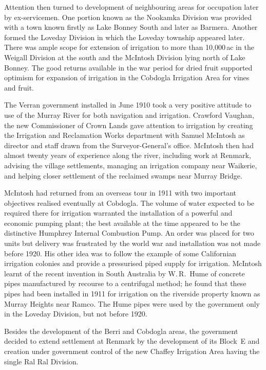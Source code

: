 Attention then turned to development of neighbouring areas for
occupation later by ex-servicemen.  One portion known as the Nookamka
Division was provided with a town known firstly as Lake Bonney South
and later as Barmera.  Another formed the Loveday Division in which
the Loveday township appeared later.  There was ample scope for
extension of irrigation to more than 10,000\,ac in the Weigall
Division at the south and the McIntosh Division lying north of Lake
Bonney.  The good returns available in the war period for dried fruit
supported optimism for expansion of irrigation in the Cobdogla
Irrigation Area for vines and fruit.

The Verran government installed in June 1910 took a very positive
attitude to use of the Murray River for both navigation and
irrigation.  Crawford Vaughan, the new Commissioner of Crown Lands
gave attention to irrigation by creating the Irrigation and
Reclamation Works department with Samuel McIntosh as director and
staff drawn from the Surveyor-General's office.  McIntosh then had
almost twenty years of experience along the river, including work at
Renmark, advising the village settlements, managing an irrigation
company near Waikerie, and helping closer settlement of the reclaimed
swamps near Murray Bridge.

McIntosh had returned from an overseas tour in 1911 with two important
objectives realised eventually at Cobdogla.  The volume of water
expected to be required there for irrigation warranted the
installation of a powerful and economic pumping plant; the best
available at the time appeared to be the distinctive Humphrey Internal
Combustion Pump.  An order was placed for two units but delivery was
frustrated by the world war and installation was not made before 1920.
His other idea was to follow the example of some Californian
irrigation colonies and provide a pressurised piped supply for
irrigation.  McIntosh learnt of the recent invention in South
Australia by W.\,R.~Hume of concrete pipes manufactured by recourse to
a centrifugal method; he found that these pipes had been installed in
1911 for irrigation on the riverside property known as Murray Heights
near Ramco.  The Hume pipes were used by the government only in the
Loveday Division, but not before 1920.

Besides the development of the Berri and Cobdogla areas, the
government decided to extend settlement at Renmark by the development
of its Block~E and creation under government control of the new
Chaffey Irrigation Area having the single Ral Ral Division.

